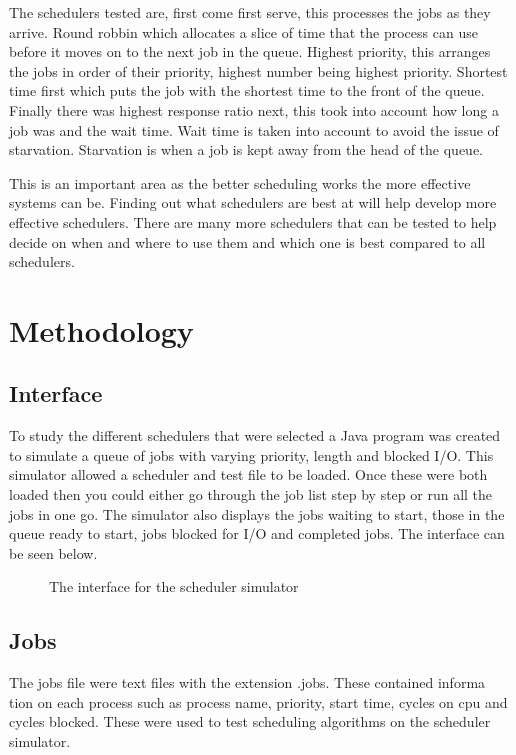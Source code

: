 \documentclass{acm_proc_article-sp}
\begin{document}
The schedulers tested are, first come first serve, this processes the jobs as they arrive. Round robbin which allocates a slice of time that the process can use before it moves on to the next job in the queue. Highest priority, this arranges the jobs in order of their priority, highest number being highest priority. Shortest time first which puts the job with the shortest time to the front of the queue. Finally there was highest response ratio next, this took into account how long a job was and the wait time. Wait time is taken into account to avoid the issue of starvation. Starvation is when a job is kept away from the head of the queue.

	This is an important area as the better scheduling works the more effective systems can be. Finding out what schedulers are best at will help develop more effective schedulers. There are many more schedulers that can be tested to help decide on when and where to use them and which one is best compared to all schedulers.


\section{Methodology}
\subsection{Interface}
To study the different schedulers that were selected a Java program was created to simulate a queue of jobs with varying priority, length and blocked I/O. This simulator allowed a scheduler and test file to be loaded. Once these were both loaded then you could either go through the job list step by step or run all the jobs in one go. The simulator also displays the jobs waiting to start, those in the queue ready to start, jobs blocked for I/O and completed jobs. The interface can be seen below.

\begin{figure}
\centering
{}
\caption{The interface for the scheduler simulator}
\end{figure}

\subsection{Jobs}
The jobs file were text files with the extension .jobs. These contained informa
tion on each process such as process name, priority, start time, cycles on cpu
and cycles blocked. These were used to test scheduling algorithms on the scheduler simulator.
\end{document}
